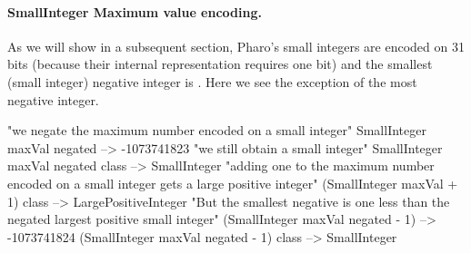 \documentclass[a4paper,10pt,twoside]{book}
\begin{document}
%	
% 



%
%
%	


\paragraph{SmallInteger Maximum value encoding.}		
As we will show in a subsequent section, Pharo's small integers are encoded on 31 bits (because their internal representation requires one bit) and the smallest (small integer) negative integer is . Here we see the exception of the most negative integer. 


\begin{code}{} 
"we negate the maximum number encoded on a small integer"
SmallInteger maxVal negated	 
	  	--> -1073741823
"we still obtain a small integer"		
SmallInteger maxVal negated class
		--> SmallInteger
"adding one to the maximum number encoded on a small integer gets a large positive integer"
(SmallInteger maxVal + 1) class
		--> LargePositiveInteger		
"But the smallest negative is one less than the negated largest positive small integer"		
(SmallInteger maxVal negated - 1) 
		--> -1073741824 
(SmallInteger maxVal negated - 1) class 
		--> SmallInteger 		 
\end{code}
\end{document}
